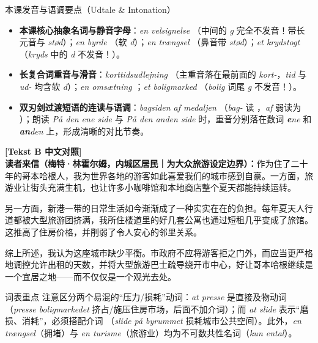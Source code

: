 \begin{tipbox}{本课发音与语调要点（Udtale \& Intonation）}
\begin{itemize}
  \item \textbf{本课核心抽象名词与静音字母}：\textit{en velsignelse} （中间的 \textit{g} 完全不发音！带长元音与 \textit{stød}）；\textit{en byrde} （软 \textit{d}）；\textit{en trængsel} （鼻音带 \textit{stød}）；\textit{et krydstogt} （\textit{kryds} 中的 \textit{d} 不发音！）。
  \item \textbf{长复合词重音与滑音}：\textit{korttidsudlejning} （主重音落在最前面的 \textit{kort-}，\textit{tid} 与 \textit{ud-} 均含软 \textit{d}）；\textit{en omsætning} ；\textit{et boligmarked} （\textit{bolig} 词尾 \textit{g} 不发音！）。
  \item \textbf{双刃剑过渡短语的连读与语调}：\textit{bagsiden af medaljen} （\textit{bag-} 读 ，\textit{af} 弱读为 ）；朗读 \textit{På den ene side} 与 \textit{På den anden side} 时，重音分别落在数词 \textit{\textbf{e}ne} 和 \textit{\textbf{an}den} 上，形成清晰的对比节奏。
\end{itemize}
\end{tipbox}

\begin{transbox}
\small
\textbf{\color{NCDTeal}[Tekst B 中文对照]}\\
\textbf{读者来信（梅特·林霍尔姆，内城区居民｜为大众旅游设定边界）：}作为住了二十年的哥本哈根人，我为世界各地的游客如此喜爱我们的城市感到自豪。一方面，旅游业让街头充满生机，也让许多小咖啡馆和本地商店整个夏天都能持续运转。

另一方面，新港一带的日常生活如今渐渐成了一种实实在在的负担。每年夏天人行道都被大型旅游团挤满，我所住楼道里的好几套公寓也通过短租几乎变成了旅馆。这推高了住房价格，并削弱了令人安心的邻里关系。

综上所述，我认为这座城市缺少平衡。市政府不应将游客拒之门外，而应当更严格地调控允许出租的天数，并将大型旅游巴士疏导绕开市中心，好让哥本哈根继续是一个宜居之地——而不仅仅是一个观光去处。
\end{transbox}


\begin{tipbox}{词表重点}
注意区分两个易混的“压力/损耗”动词：\textit{at presse} 是直接及物动词（\textit{presse boligmarkedet} 挤占/施压住房市场，后面不加介词）；而 \textit{at slide} 表示“磨损、消耗”，必须搭配介词 （\textit{slide på byrummet} 损耗城市公共空间）。此外，\textit{en trængsel}（拥堵）与 \textit{en turisme}（旅游业）均为不可数共性名词（\textit{kun ental}）。
\end{tipbox}

